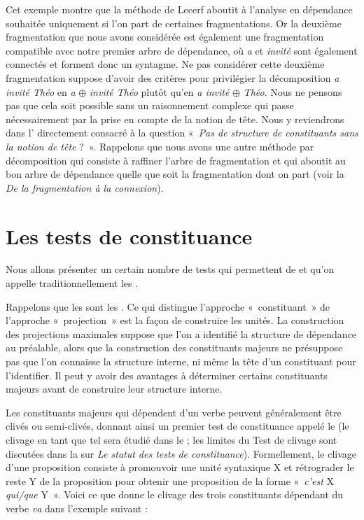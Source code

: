 {    Cet exemple montre que la méthode de Lecerf aboutit à l’analyse en dépendance souhaitée uniquement si l’on part de certaines fragmentations. Or la deuxième fragmentation que nous avons considérée est également une fragmentation compatible avec notre premier arbre de dépendance, où \textit{a} et \textit{invité} sont également connectés et forment donc un syntagme. Ne pas considérer cette deuxième fragmentation suppose d’avoir des critères pour privilégier la décomposition \textit{a invité Théo} en \textit{a} \textrm{${\oplus}$} \textit{invité Théo} plutôt qu’en \textit{a invité} \textrm{${\oplus}$} \textit{Théo}. Nous ne pensons pas que cela soit possible sans un raisonnement complexe qui passe nécessairement par la prise en compte de la notion de tête. Nous y reviendrons dans l’ directement consacré à la question «~\textit{Pas de structure de constituants sans la notion de tête} ?~». Rappelons que nous avons une autre méthode par décomposition qui consiste à raffiner l’arbre de fragmentation et qui aboutit au bon arbre de dépendance quelle que soit la fragmentation dont on part (voir la  \textit{De la fragmentation à la connexion}).
}
\section{Les tests de constituance}\label{sec:3.4.10}\largerpage[-1]

Nous allons présenter un certain nombre de tests qui permettent de  et qu’on appelle traditionnellement les .

Rappelons que les  sont les . Ce qui distingue l’approche «~constituant~» de l’approche «~projection~» est la façon de construire les unités. La construction des projections maximales suppose que l’on a identifié la structure de dépendance au préalable, alors que la construction des constituants majeurs ne présuppose pas que l’on connaisse la structure interne, ni même la tête d’un constituant pour l’identifier. Il peut y avoir des avantages à déterminer certains constituants majeurs avant de construire leur structure interne.

Les constituants majeurs qui dépendent d’un verbe peuvent généralement être clivés ou semi-clivés, donnant ainsi un premier test de constituance appelé le  (le clivage en tant que tel sera étudié dans le  ; les limites du Test de clivage sont discutées dans la  sur \textit{Le statut des tests de constituance}). Formellement, le clivage d'une proposition consiste à promouvoir une unité syntaxique X et rétrograder le reste Y de la proposition pour obtenir une proposition de la forme «~\textit{c'est} X \textit{qui/que}
Y~».
Voici ce que donne le clivage des trois constituants dépendant du verbe \textit{va} dans l’exemple suivant :

